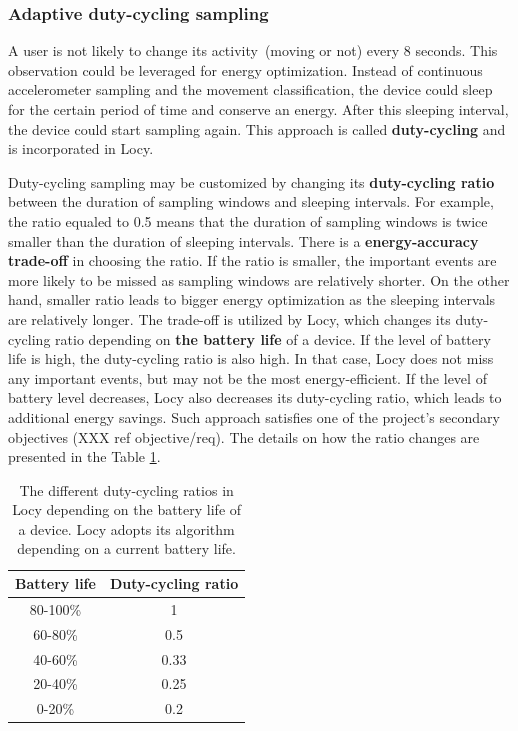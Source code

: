 \subsubsection{Adaptive duty-cycling sampling}
\label{s:design:locy:adaptive}
\hspace{10pt}A user is not likely to change its activity\ (moving or not) every 8 seconds. This observation could be leveraged for energy optimization. Instead of continuous accelerometer sampling and the movement classification, the device could sleep for the certain period of time and conserve an energy. After this sleeping interval, the device could start sampling again. This approach is called \textbf{duty-cycling} and is incorporated in Locy. 

Duty-cycling sampling may be customized by changing its \textbf{duty-cycling ratio} between the duration of sampling windows and sleeping intervals. For example, the ratio equaled to 0.5 means that the duration of sampling windows is twice smaller than the duration of sleeping intervals. There is a \textbf{energy-accuracy trade-off} in choosing the ratio. If the ratio is smaller, the important events are more likely to be missed as sampling windows are relatively shorter. On the other hand, smaller ratio leads to bigger energy optimization as the sleeping intervals are relatively longer. The trade-off is utilized by Locy, which changes its duty-cycling ratio depending on \textbf{the battery life} of a device. If the level of battery life is high, the duty-cycling ratio is also high. In that case, Locy does not miss any important events, but may not be the most energy-efficient. If the level of battery level decreases, Locy also decreases its duty-cycling ratio, which leads to additional energy savings. Such approach satisfies one of the project's secondary objectives (XXX ref objective/req). The details on how the ratio changes are presented in the Table \ref{table:locy:dutycyclingratio}.

\begin{table}[H]
	\centering
    \begin{tabular}{| c | c | }
    \hline
    Battery life & Duty-cycling ratio \\ \hline
    80-100\% & 1 \\ \hline
    60-80\% & 0.5\\ \hline
    40-60\% & 0.33\\ \hline
    20-40\% & 0.25\\ \hline
    0-20\% & 0.2 \\ \hline
    \end{tabular}
    \caption{The different duty-cycling ratios in Locy depending on the battery life of a device. Locy adopts its algorithm depending on a current battery life. }
	\label{table:locy:dutycyclingratio}
\end{table}	

